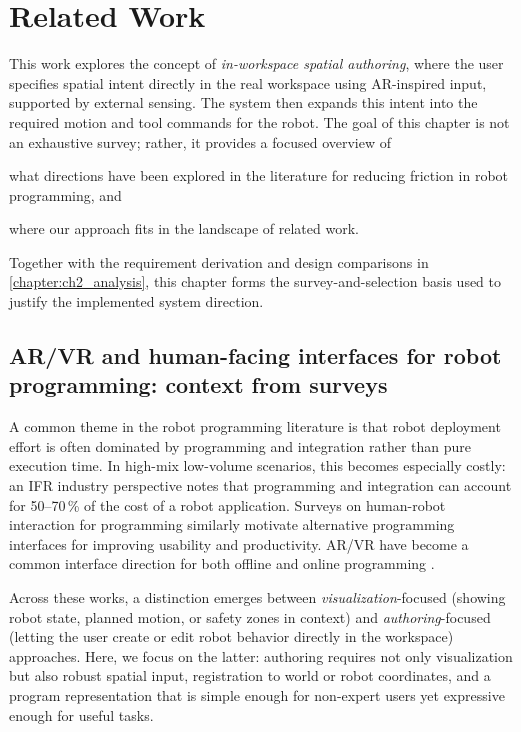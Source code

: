 \chapter{Related Work} \label{chapter:ch1_related_work}

This work explores the concept of \emph{in-workspace spatial authoring}, where the user specifies spatial intent directly in the real workspace using AR-inspired input, supported by external sensing. The system then expands this intent into the required motion and tool commands for the robot. The goal of this chapter is not an exhaustive survey; rather, it provides a focused overview of
\begin{enumerate*}[label=(\roman*)]
    \item what directions have been explored in the literature for reducing friction in robot programming, and
    \item where our approach fits in the landscape of related work.
\end{enumerate*}
Together with the requirement derivation and design comparisons in \autoref{chapter:ch2_analysis}, this chapter forms the survey-and-selection basis used to justify the implemented system direction.

\section[AR/VR interfaces: context from surveys]{AR/VR and human-facing interfaces for robot programming: context from surveys}

A common theme in the robot programming literature is that robot deployment effort is often dominated by programming and integration rather than pure execution time. In high-mix low-volume scenarios, this becomes especially costly: an IFR industry perspective \cite{IFR2023TraditionalVsNew} notes that programming and integration can account for 50--70\,\% of the cost of a robot application. Surveys on human-robot interaction for programming \cite{VILLANI201866} similarly motivate alternative programming interfaces for improving usability and productivity. AR/VR have become a common interface direction for both offline and online programming \cite{Makhataeva2020, DIANATFAR2021407}.

Across these works, a distinction emerges between \emph{visualization}-focused (showing robot state, planned motion, or safety zones in context) and \emph{authoring}-focused (letting the user create or edit robot behavior directly in the workspace) approaches. Here, we focus on the latter: authoring requires not only visualization but also robust spatial input, registration to world or robot coordinates, and a program representation that is simple enough for non-expert users yet expressive enough for useful tasks.

